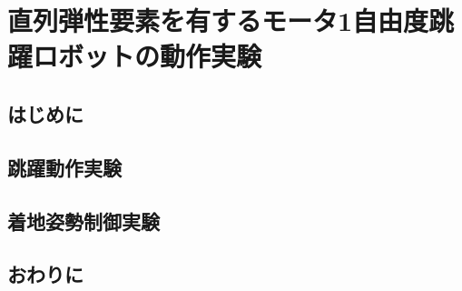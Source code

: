 \chapter[直列弾性要素を有するモータ1自由度跳躍ロボットの動作実験]%
        {直列弾性要素を有するモータ1自由度跳躍ロボットの動作実験}
    \section{はじめに}
    \section{跳躍動作実験}
    \section{着地姿勢制御実験}
    \section{おわりに}